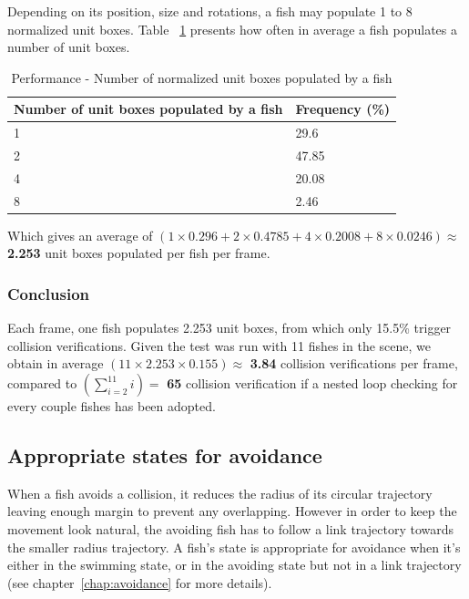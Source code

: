 Depending on its position, size and rotations, a fish may populate 1 to 8 normalized unit boxes. Table ~\ref{tab:numberunitboxfish} presents how often in average a fish populates a number of unit boxes.

\begin{table}[H]
\centering
\begin{tabular} { | l | l | }
\hline
\textbf{Number of unit boxes populated by a fish} & \textbf{Frequency (\%)} \\
\hline
1 & 29.6 \\
\hline
2 & 47.85 \\
\hline
4 & 20.08 \\
\hline
8 & 2.46 \\
\hline
\end{tabular}
\caption{Performance - Number of normalized unit boxes populated by a fish}
\label{tab:numberunitboxfish}
\end{table}

Which gives an average of $(1 \times 0.296 + 2 \times 0.4785 + 4 \times 0.2008 + 8 \times 0.0246) \approx$ \textbf{2.253} unit boxes populated per fish per frame.

\subsubsection{Conclusion}

Each frame, one fish populates 2.253 unit boxes, from which only 15.5\% trigger collision verifications. Given the test was run with 11 fishes in the scene, we obtain in average $(11 \times 2.253 \times 0.155) \approx $ \textbf{3.84} collision verifications per frame, compared to $(\sum\limits_{i=2}^{11} i) =$ \textbf{65} collision verification if a nested loop checking for every couple fishes has been adopted.

\subsection{Appropriate states for avoidance}
When a fish avoids a collision, it reduces the radius of its circular trajectory leaving enough margin to prevent any overlapping. However in order to keep the movement look natural, the avoiding fish has to follow a link trajectory towards the smaller radius trajectory. A fish's state is appropriate for avoidance when it's either in the swimming state, or in the avoiding state but not in a link trajectory (see chapter~\ref{chap:avoidance} for more details).\\

